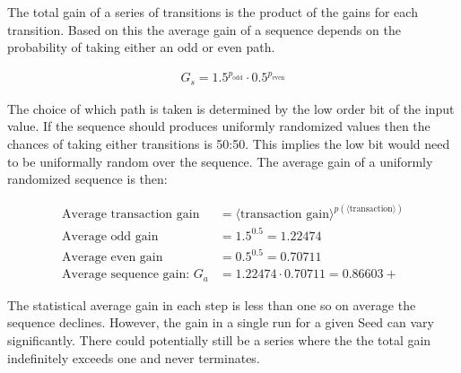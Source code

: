 \documentclass[preprint,natbib]{sigplanconf}
\begin{document}
The total gain of a series of transitions is the product of the gains for each transition. Based on this the average gain of a sequence depends on the probability of taking either an odd or even path.

\begin{align*}
    G_s = 1.5^{p_{\text{odd}}} \cdot 0.5^{p_{\text{even}}}
\end{align*}

The choice of which path is taken is determined by the low order bit of the input value. If the sequence should produces uniformly randomized values then the chances of taking either transitions is 50:50. This implies the low bit would need to be uniformally random over the sequence. The average gain of a uniformly randomized sequence is then:

\begin{align*}
    \text{Average transaction gain}    & = \langle \text{transaction gain} \rangle^{p(\langle \text{transaction} \rangle)} \\
    \text{Average odd gain}            & = 1.5^{0.5} = 1.22474                                                             \\
    \text{Average even gain}           & = 0.5^{0.5} = 0.70711                                                             \\
    \text{Average sequence gain: } G_a & = 1.22474 \cdot 0.70711 = 0.86603+
\end{align*}

The statistical average gain in each step is less than one so on average the sequence declines. However, the gain in a single run for a given Seed can vary significantly. There could potentially still be a series where the the total gain indefinitely exceeds one and never terminates.
\end{document}
